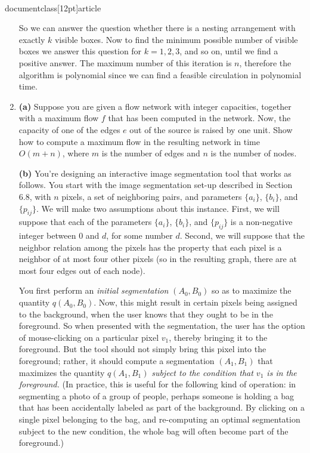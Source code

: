 \\documentclass[12pt]{article}
\begin{document}
\begin{enumerate}
{\bigskip

So we can answer the question whether there is
a nesting arrangement with exactly $k$ visible boxes.
Now to find the minimum possible number of visible boxes we answer
this question for $k=1,2,3$, and so on, until we find a positive answer.
The maximum number of this iteration is $n$, therefore the algorithm is
polynomial since we can find a feasible circulation in polynomial time.

}


\item 

{\bf (a)}
Suppose you are given a flow network with integer capacities,
together with a maximum flow $f$ that has been computed in the network.
Now, the capacity of one of the edges $e$ out of the source
is raised by one unit.
Show how to compute a maximum flow in the resulting network
in time $O(m + n)$, where $m$ is the number of edges
and $n$ is the number of nodes.

{\bf (b)}
You're designing an interactive image segmentation tool
that works as follows.
You start with the image segmentation set-up described in Section 6.8,
with $n$ pixels, a set of neighboring pairs, and parameters
$\{a_i\}$, $\{b_i\}$, and $\{p_{ij}\}$.
We will make two assumptions about this instance.
First, we will suppose that each of the parameters
$\{a_i\}$, $\{b_i\}$, and $\{p_{ij}\}$
is a non-negative integer between $0$ and $d$,
for some number $d$.
Second, we will suppose that the neighbor relation
among the pixels has the property
that each pixel is a neighbor of at most four other pixels
(so in the resulting graph, there are at most four edges out of each node).

You first perform an {\em initial segmentation} $(A_0,B_0)$
so as to maximize the quantity $q(A_0,B_0)$.
Now, this might result in certain pixels
being assigned to the background, when the user
knows that they ought to be in the foreground.
So when presented with the segmentation, the user has
the option of mouse-clicking on a particular pixel $v_1$,
thereby bringing it to the foreground.
But the tool should not simply bring this pixel
into the foreground;
rather, it should compute a segmentation $(A_1,B_1)$
that maximizes the quantity $q(A_1,B_1)$
{\em subject to the condition that $v_1$ is in the foreground.}
(In practice, this is useful for the following kind of operation:
in segmenting a photo of a group of people, perhaps someone is holding a bag
that has been accidentally labeled as part of the background.
By clicking on a single pixel belonging to the bag,
and re-computing an optimal segmentation subject to the new condition,
the whole bag will often become part of the foreground.)


\end{enumerate}
\end{document}
